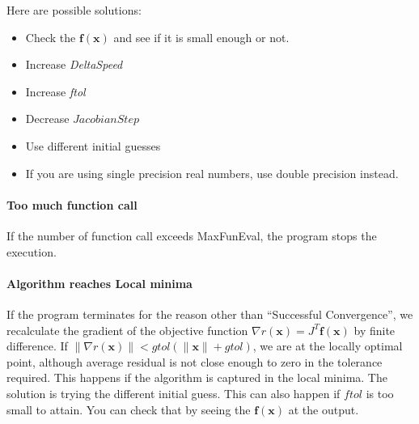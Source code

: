 \documentclass[12pt]{article}
\def\xb{{\mathbf{x}}}
\def\fb{{\mathbf{f}}}
\begin{document}
Here are possible solutions:
\begin{itemize}
\item Check the $\fb(\xb)$ and see if it is small enough or not. 
\item Increase \textit{DeltaSpeed}
\item Increase \textit{ftol}
\item Decrease $JacobianStep$
\item Use different initial guesses
\item If you are using single precision real numbers, use double precision instead. 
\end{itemize}


\paragraph{Too much function call}
If the number of function call exceeds MaxFunEval, the program stops the execution. 

\paragraph{Algorithm reaches Local minima}
If the program terminates for the reason other than ``Successful Convergence'', we recalculate the
gradient of the objective function $\nabla r(\xb) = J^T\fb(\xb)$ by finite difference. If
$\|\nabla r(\xb)\| < gtol(\|\xb\|+gtol)$, we are at the locally optimal point, although average
residual is not close enough to zero in the tolerance required. This happens if the algorithm is
captured in the local minima. The solution is trying the different initial guess. This can also
happen if $ftol$ is too small to attain. You can check that by seeing the $\fb(\xb)$ at the
output.  
\end{document}
